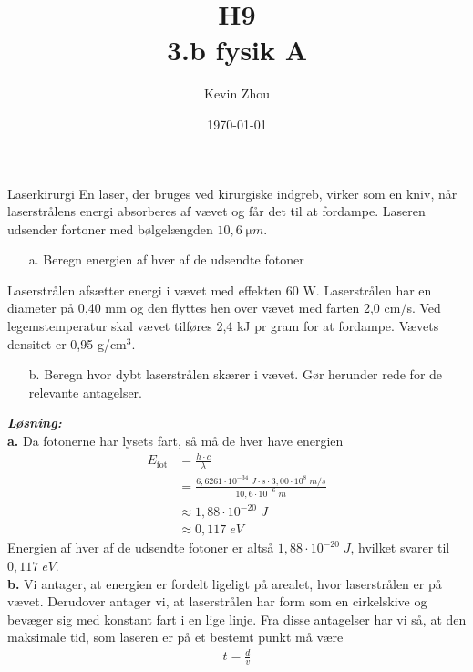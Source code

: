 \documentclass{report}
\title{H9\\
{\Large \textbf{3.b fysik A}}}
\author{Kevin Zhou}
\date{\today}
\newcommand{\sol}{\setlength{\parindent}{0cm}\textbf{\textit{Løsning:}}\setlength{\parindent}{1cm}}
\begin{document}
\maketitle
\begin{question}{Laserkirurgi}{}
En laser, der bruges ved kirurgiske indgreb, virker som en kniv, når laserstrålens energi absorberes af vævet og får det til at fordampe. Laseren udsender fortoner med bølgelængden $10,6 \;\unit{\micro m} $.
\begin{itemize}
  \item[a.] Beregn energien af hver af de udsendte fotoner
\end{itemize}
Laserstrålen afsætter energi i vævet med effekten 60 W. Laserstrålen har en diameter på 0,40 mm og den flyttes hen over vævet med farten 2,0 cm/s. Ved legemstemperatur skal vævet tilføres 2,4 kJ pr gram for at fordampe. Vævets densitet er 0,95 g/cm$^3.$
\begin{itemize}
  \item[b.] Beregn hvor dybt laserstrålen skærer i vævet. Gør herunder rede for de relevante antagelser.
\end{itemize}
\end{question}
\sol \\
\textbf{a.}
Da fotonerne har lysets fart, så må de hver have energien 
\begin{equation*}
\begin{split}
E_{\text{fot} }&=\frac{h \cdot c}{\lambda }\\
&=\frac{6,6261 \cdot 10 ^{-34}\;\unit{J \cdot s} \cdot 3,00 \cdot 10 ^{8} \;\unit{m/s} }{10,6 \cdot 10 ^{-6} \;\unit{m} }\\
&\approx 1,88 \cdot 10 ^{-20} \;\unit{J} \\
&\approx 0,117 \;\unit{eV} 
\end{split}
\end{equation*}
Energien af hver af de udsendte fotoner er altså $1,88 \cdot 10 ^{-20} \;\unit{J} $, hvilket svarer til $0,117 \;\unit{eV} $.\\[1ex]
\textbf{b.}
Vi antager, at energien er fordelt ligeligt på arealet, hvor laserstrålen er på vævet.
Derudover antager vi, at laserstrålen har form som en cirkelskive og bevæger sig med konstant fart i en lige linje.
Fra disse antagelser har vi så, at den maksimale tid, som laseren er på et bestemt punkt må være
\begin{equation*}
\begin{split}
t=\frac{d}{v}
\end{split}
\end{equation*}
\end{document}
